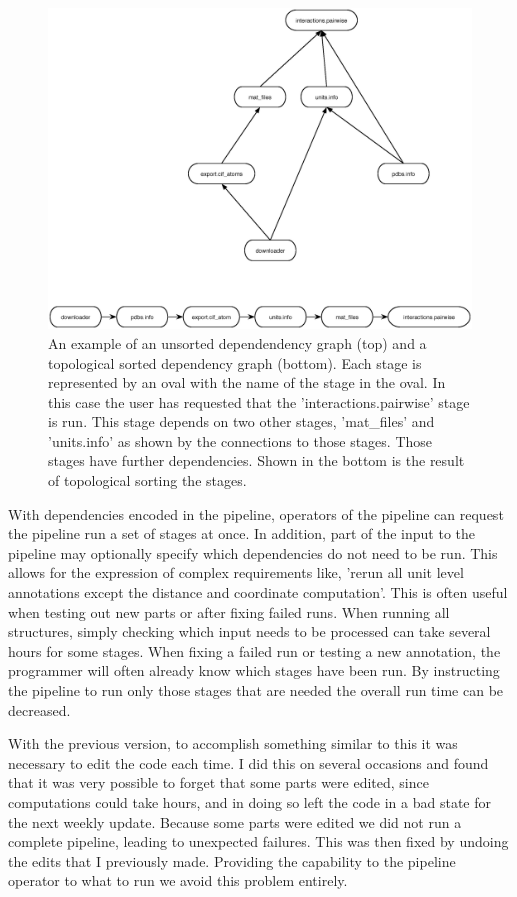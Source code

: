 \begin{figure}
\includegraphics{chapter-2/figs/deps}
\caption{An example of an unsorted dependendency graph (top) and a topological
  sorted dependency graph (bottom). Each stage is represented by an oval with
  the name of the stage in the oval. In this case the user has requested that
  the 'interactions.pairwise' stage is run. This stage depends on two other
stages, 'mat\_files' and 'units.info' as shown by the connections to those
stages. Those stages have further dependencies. Shown in the bottom is the
result of topological sorting the stages.}
\label{fig:stage-deps}
\end{figure}

With dependencies encoded in the pipeline, operators of the pipeline can request
the pipeline run a set of stages at once. In addition, part of the input to the
pipeline may optionally specify which dependencies do not need to be run. This
allows for the expression of complex requirements like, 'rerun all unit level
annotations except the distance and coordinate computation'. This is often
useful when testing out new parts or after fixing failed runs. When running all
structures, simply checking which input needs to be processed can take several
hours for some stages. When fixing a failed run or testing a new annotation, the
programmer will often already know which stages have been run. By instructing
the pipeline to run only those stages that are needed the overall run time can
be decreased.

With the previous version, to accomplish something similar to this it was
necessary to edit the code each time. I did this on several occasions and found
that it was very possible to forget that some parts were edited, since
computations could take hours, and in doing so left the code in a bad state for
the next weekly update. Because some parts were edited we did not run a complete
pipeline, leading to unexpected failures. This was then fixed by undoing the
edits that I previously made. Providing the capability to the pipeline operator
to what to run we avoid this problem entirely.

